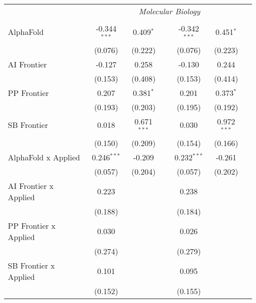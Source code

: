 \begin{tabular}{lcccccc}
 & \multicolumn{6}{c}{\textit{Molecular Biology}} \\ \\
   AlphaFold                    & -0.344$^{***}$ & 0.409$^{*}$   &               & -0.342$^{***}$ & 0.451$^{*}$   &   \\   
                                & (0.076)        & (0.222)       &               & (0.076)        & (0.223)       &   \\   
   AI Frontier                  & -0.127         & 0.258         &               & -0.130         & 0.244         &   \\   
                                & (0.153)        & (0.408)       &               & (0.153)        & (0.414)       &   \\   
   PP Frontier                  & 0.207          & 0.381$^{*}$   &               & 0.201          & 0.373$^{*}$   &   \\   
                                & (0.193)        & (0.203)       &               & (0.195)        & (0.192)       &   \\   
   SB Frontier                  & 0.018          & 0.671$^{***}$ &               & 0.030          & 0.972$^{***}$ &   \\   
                                & (0.150)        & (0.209)       &               & (0.154)        & (0.166)       &   \\   
   AlphaFold x Applied          & 0.246$^{***}$  & -0.209        &               & 0.232$^{***}$  & -0.261        &   \\   
                                & (0.057)        & (0.204)       &               & (0.057)        & (0.202)       &   \\   
   AI Frontier x Applied        & 0.223          &               &               & 0.238          &               &   \\   
                                & (0.188)        &               &               & (0.184)        &               &   \\   
   PP Frontier x Applied        & 0.030          &               &               & 0.026          &               &   \\   
                                & (0.274)        &               &               & (0.279)        &               &   \\   
   SB Frontier x Applied        & 0.101          &               &               & 0.095          &               &   \\   
                                & (0.152)        &               &               & (0.155)        &               &   \\   

\end{tabular}
